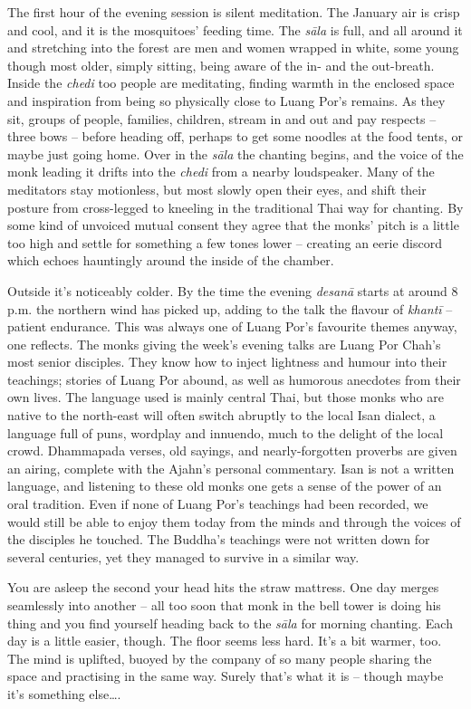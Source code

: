 The first hour of the evening session is silent meditation. The January
air is crisp and cool, and it is the mosquitoes' feeding time. The
\emph{sāla} is full, and all around it and stretching into the forest
are men and women wrapped in white, some young though most older, simply
sitting, being aware of the in- and the out-breath. Inside the
\emph{chedi} too people are meditating, finding warmth in the enclosed
space and inspiration from being so physically close to Luang Por's
remains. As they sit, groups of people, families, children, stream in
and out and pay respects -- three bows -- before heading off, perhaps to
get some noodles at the food tents, or maybe just going home. Over in
the \emph{sāla} the chanting begins, and the voice of the monk leading
it drifts into the \emph{chedi} from a nearby loudspeaker. Many of the
meditators stay motionless, but most slowly open their eyes, and shift
their posture from cross-legged to kneeling in the traditional Thai way
for chanting. By some kind of unvoiced mutual consent they agree that
the monks' pitch is a little too high and settle for something a few
tones lower -- creating an eerie discord which echoes hauntingly around
the inside of the chamber. 

Outside it's noticeably colder. By the time the evening \emph{desanā}
starts at around 8 p.m. the northern wind has picked up, adding to the
talk the flavour of \emph{khantī} -- patient endurance. This was always
one of Luang Por's favourite themes anyway, one reflects. The monks
giving the week's evening talks are Luang Por Chah's most senior
disciples. They know how to inject lightness and humour into their
teachings; stories of Luang Por abound, as well as humorous anecdotes
from their own lives. The language used is mainly central Thai, but
those monks who are native to the north-east will often switch abruptly
to the local Isan dialect, a language full of puns, wordplay and
innuendo, much to the delight of the local crowd. Dhammapada verses, old
sayings, and nearly-forgotten proverbs are given an airing, complete
with the Ajahn's personal commentary. Isan is not a written language, 
and listening to these old monks one gets a sense of the power of an
oral tradition. Even if none of Luang Por's teachings had been recorded, 
we would still be able to enjoy them today from the minds and through
the voices of the disciples he touched. The Buddha's teachings were not
written down for several centuries, yet they managed to survive in a
similar way. 

You are asleep the second your head hits the straw mattress. One day
merges seamlessly into another -- all too soon that monk in the bell
tower is doing his thing and you find yourself heading back to the
\emph{sāla} for morning chanting. Each day is a little easier, though. 
The floor seems less hard. It's a bit warmer, too. The mind is uplifted, 
buoyed by the company of so many people sharing the space and practising
in the same way. Surely that's what it is -- though maybe it's something
else\ldots{}. 

